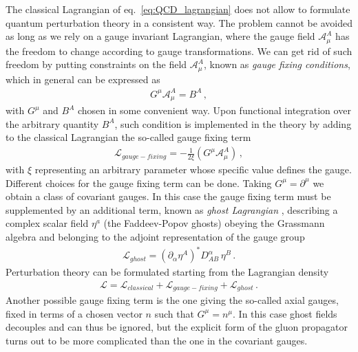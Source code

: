 %
The classical Lagrangian of eq.~\eqref{eq:QCD_lagrangian} does not allow to formulate quantum
perturbation theory in a consistent way. The problem cannot be avoided as long as
we rely on a gauge invariant Lagrangian, where the gauge field $\mathcal{A}^A_{\mu}$
has the freedom to change according to gauge transformations.
We can get rid of such freedom by putting constraints on the field $\mathcal{A}^A_{\mu}$, 
known as \textit{gauge fixing conditions}, which in general can be expressed as
\begin{align}
    \label{eq:gauge_fixing}
    G^{\mu}\mathcal{A}_{\mu}^A = B^A\,,
\end{align}
with $G^{\mu}$ and $B^A$ chosen in some convenient way. 
Upon functional integration over the arbitrary quantity $B^A$, such condition is implemented 
in the theory by adding to the classical Lagrangian the so-called gauge fixing term
\begin{align}
    \label{eq:Gauge_fixing_lorents}
    \mathcal{L}_{gauge-fixing} = -\frac{1}{2\xi}\left(G^{\mu}\mathcal{A}_{\mu}^A\right)\,,
\end{align}
with $\xi$ representing an arbitrary parameter whose specific value defines the gauge.
Different choices for the gauge fixing term can be done. Taking $G^{\mu}=\partial^{\mu}$ we obtain
a class of covariant gauges. In this case the gauge fixing term must be supplemented by an additional term,
known as \textit{ghost Lagrangian} \cite{Faddeev:1967fc},
describing a complex scalar field $\eta^a$ (the Faddeev-Popov ghosts) obeying the Grassmann algebra and belonging to the adjoint
representation of the gauge group
\begin{align}
    \label{eq:ghosts_lagrangian}
    \mathcal{L}_{ghost} = \left(\partial_{\alpha}\eta^A\right)^* D^{\alpha}_{AB}\, \eta^B\, .
\end{align}
Perturbation theory can be formulated starting from the Lagrangian density
\begin{align}
    \label{eq:QCD_lagrangian_gauge_fixing}
    \mathcal{L} = \mathcal{L}_{classical} + \mathcal{L}_{gauge-fixing} + \mathcal{L}_{ghost}\, .
\end{align}
Another possible gauge fixing term is the one giving the so-called axial gauges, fixed
in terms of a chosen vector $n$ such that $G^{\mu}=n^{\mu}$. In this case ghost fields decouples
and can thus be ignored, but the explicit form of the gluon propagator turns out to be more complicated than 
the one in the covariant gauges.

